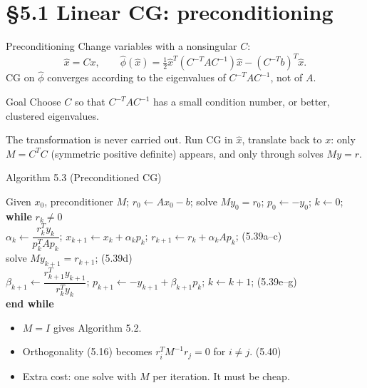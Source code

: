 \documentclass[12pt,aspectratio=169]{beamer}
\newcommand{\algblock}[1]{\begin{block}{}#1\end{block}}
\newcommand{\kw}[1]{\textbf{#1}}
\newcommand{\ind}{\hspace*{1.2em}}
\begin{document}
\section{\S5.1 Linear CG: preconditioning}

\begin{frame}{Preconditioning}
  Change variables with a nonsingular $C$:
  \begin{equation}
    \hat x = Cx, \qquad
    \hat\phi(\hat x) = \tfrac12\hat x^T(C^{-T}AC^{-1})\hat x-(C^{-T}b)^T\hat x. \tag{5.37, 5.38}
  \end{equation}
  CG on $\hat\phi$ converges according to the eigenvalues of $C^{-T}AC^{-1}$, not of $A$.
  \begin{block}{Goal}
    Choose $C$ so that $C^{-T}AC^{-1}$ has a small condition number, or better, clustered eigenvalues.
  \end{block}
  The transformation is never carried out. Run CG in $\hat x$, translate back to $x$:
  only $M=C^TC$ (symmetric positive definite) appears, and only through solves $My=r$.
\end{frame}

\begin{frame}{Algorithm 5.3 (Preconditioned CG)}
  \algblock{
    Given $x_0$, preconditioner $M$; $r_0\leftarrow Ax_0-b$; solve $My_0=r_0$; $p_0\leftarrow-y_0$; $k\leftarrow0$;\\
    \kw{while} $r_k\neq0$\\
    \ind $\alpha_k\leftarrow\dfrac{r_k^Ty_k}{p_k^TAp_k}$; \quad
      $x_{k+1}\leftarrow x_k+\alpha_kp_k$; \quad
      $r_{k+1}\leftarrow r_k+\alpha_kAp_k$; \hfill (5.39a--c)\\[1ex]
    \ind solve $My_{k+1}=r_{k+1}$; \hfill (5.39d)\\
    \ind $\beta_{k+1}\leftarrow\dfrac{r_{k+1}^Ty_{k+1}}{r_k^Ty_k}$; \quad
      $p_{k+1}\leftarrow-y_{k+1}+\beta_{k+1}p_k$; \quad $k\leftarrow k+1$; \hfill (5.39e--g)\\
    \kw{end while}
  }
  \begin{itemize}
    \item $M=I$ gives Algorithm 5.2.
    \item Orthogonality (5.16) becomes $r_i^TM^{-1}r_j=0$ for $i\neq j$. \hfill (5.40)
    \item Extra cost: one solve with $M$ per iteration. It must be cheap.
  \end{itemize}
\end{frame}
\end{document}
